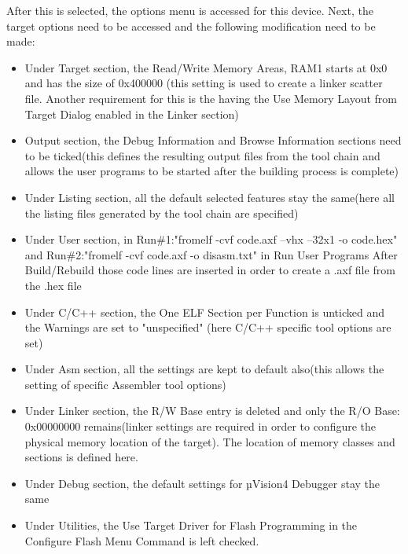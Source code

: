 After this is selected, the options menu is accessed for this device. Next, the target options need to be accessed and the following modification need to be made:

\begin{itemize}

\item {Under Target section, the Read/Write Memory Areas, RAM1 starts at 0x0 and has the size of 0x400000 (this setting is used to create a linker scatter file. Another requirement for this is the having the Use Memory Layout from Target Dialog enabled in the Linker section)}

\item {Output section, the Debug Information and Browse Information sections need to be ticked(this defines the resulting output files from the tool chain and allows the user programs to be started after the building process is complete)}

\item {Under Listing section, all the default selected features stay the same(here all the listing files generated by the tool chain are specified)}

\item {Under User section, in Run\#1:"fromelf -cvf code.axf --vhx --32x1 -o code.hex" and Run\#2:"fromelf -cvf code.axf -o disasm.txt" in Run User Programs After Build/Rebuild those code lines are inserted in order to create a .axf file from the .hex file}

\item {Under C/C++ section, the One ELF Section per Function is unticked and the Warnings are set to "unspecified" (here C/C++ specific tool options are set)}

\item {Under Asm section, all the settings are kept to default also(this allows the setting of specific Assembler tool options)}

\item {Under Linker section, the R/W Base entry is deleted and only the R/O Base: 0x00000000 remains(linker settings are required in order to configure the physical memory location of the target). The location of memory classes and sections is defined here.}

\item {Under Debug section, the default settings for µVision4 Debugger stay the same}

\item {Under Utilities, the Use Target Driver for Flash Programming in the Configure Flash Menu Command is left checked.}

\end{itemize}

